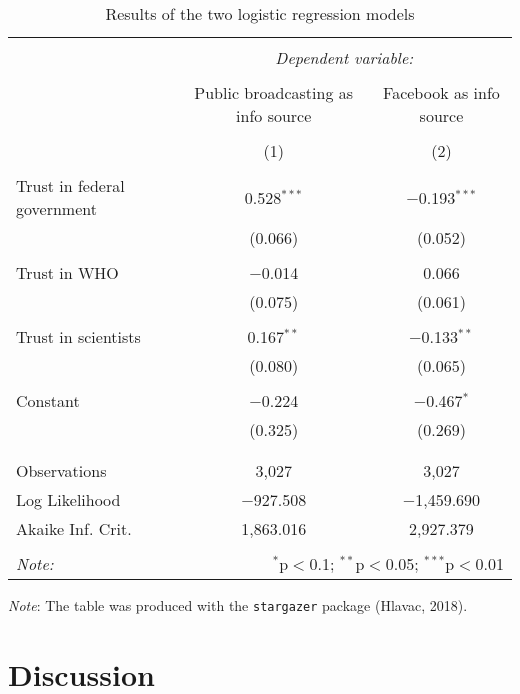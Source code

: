\documentclass[
]{article}
\begin{document}
\begin{table}[!htbp] \centering 
  \caption{Results of the two logistic regression models} 
  \label{Regression results} 
\begin{tabular}{@{\extracolsep{5pt}}lcc} 
\\[-1.8ex]\hline 
\hline \\[-1.8ex] 
 & \multicolumn{2}{c}{\textit{Dependent variable:}} \\ 
\cline{2-3} 
\\[-1.8ex] & Public broadcasting as info source & Facebook as info source \\ 
\\[-1.8ex] & (1) & (2)\\ 
\hline \\[-1.8ex] 
 Trust in federal government & 0.528$^{***}$ & $-$0.193$^{***}$ \\ 
  & (0.066) & (0.052) \\ 
  & & \\ 
 Trust in WHO & $-$0.014 & 0.066 \\ 
  & (0.075) & (0.061) \\ 
  & & \\ 
 Trust in scientists & 0.167$^{**}$ & $-$0.133$^{**}$ \\ 
  & (0.080) & (0.065) \\ 
  & & \\ 
 Constant & $-$0.224 & $-$0.467$^{*}$ \\ 
  & (0.325) & (0.269) \\ 
  & & \\ 
\hline \\[-1.8ex] 
Observations & 3,027 & 3,027 \\ 
Log Likelihood & $-$927.508 & $-$1,459.690 \\ 
Akaike Inf. Crit. & 1,863.016 & 2,927.379 \\ 
\hline 
\hline \\[-1.8ex] 
\textit{Note:}  & \multicolumn{2}{r}{$^{*}$p$<$0.1; $^{**}$p$<$0.05; $^{***}$p$<$0.01} \\ 
\end{tabular} 
\end{table}

\emph{Note}: The table was produced with the \texttt{stargazer} package
(Hlavac, 2018).

\hypertarget{discussion}{%
\section{Discussion}\label{discussion}}
\end{document}

